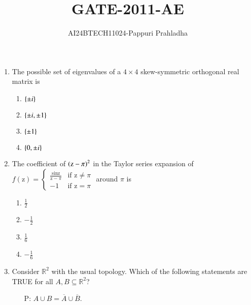 \documentclass[journal]{IEEEtran}
\begin{document}

\vspace{3cm}

\title{GATE-2011-AE}
\author{AI24BTECH11024-Pappuri Prahladha}
{\let\newpage\relax\maketitle}

\renewcommand{\thefigure}{\theenumi}
\renewcommand{\thetable}{\theenumi}
\setlength{\intextsep}{10pt} %


\renewcommand{\thetable}{\theenumi}
\begin{enumerate}
\item  The possible set of eigenvalues of a $ 4 \times 4 $ skew-symmetric orthogonal real matrix is
\begin{multicols}{4}
\begin{enumerate}
    \item $\left\{\pm i\right\}$ 
    \item $\left\{\pm i,\pm 1\right\}$
    \item $\left\{\pm 1\right\}$
    \item $\left\{0,\pm i\right\}$
\end{enumerate}
\end{multicols}
\item The coefficient of $ \left(\text{z} - \pi\right)^{2}$ in the Taylor series expansion of
$
		f(\text{z}) = \begin{cases} \frac{\sin \text{z}}{\text{z} - \pi} & \text{if}\,\,\text{z} \neq \pi \\ -1 & \text{if}\,\,\text{z} = \pi \end{cases}
$
around $\pi$ is
\begin{multicols}{4}
\begin{enumerate}
    \item $\frac{1}{2}$ 
    \item $ -\frac{1}{2} $
    \item $ \frac{1}{6}$ 
    \item $ -\frac{1}{6}$ 
\end{enumerate}
\end{multicols}
\item  Consider $ \mathbb{R}^{2} $ with the usual topology. Which of the following statements are TRUE for all $ A, B \subseteq \mathbb{R}^{2}$?
\begin{itemize}
    \item[P:]$ A \cup B = \overline{A} \cup \overline{B} $.

\end{itemize}
\end{enumerate}
\end{document}
